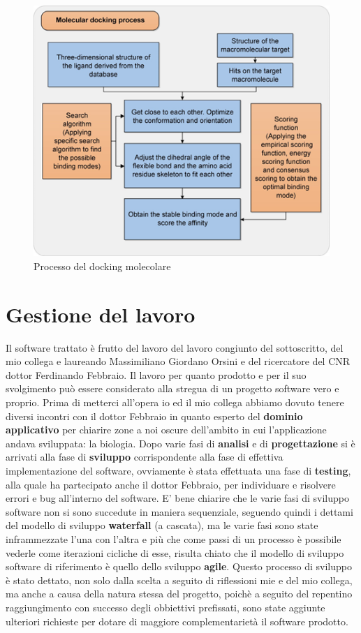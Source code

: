 \begin{figure}[H]
    \centering
    \includegraphics{immagini/processoDockingMolecolare.png}
    \caption{Processo del docking molecolare}
    \label{fig:Processo del docking Molecolare}
\end{figure}

\section{Gestione del lavoro}
Il software trattato è frutto del lavoro del lavoro congiunto del sottoscritto, del mio collega e laureando Massimiliano Giordano Orsini e del ricercatore del CNR dottor Ferdinando Febbraio. Il lavoro per quanto prodotto e per il suo svolgimento può essere considerato alla stregua di un progetto software vero e proprio. Prima di metterci all'opera io ed il mio collega abbiamo dovuto tenere diversi incontri con il dottor Febbraio in quanto esperto del \textbf{dominio applicativo} per chiarire zone a noi oscure dell'ambito in cui l'applicazione andava sviluppata: la biologia. Dopo varie fasi di \textbf{analisi} e di \textbf{progettazione} si è arrivati alla fase di \textbf{sviluppo} corrispondente alla fase di effettiva implementazione del software, ovviamente è stata effettuata una fase di \textbf{testing}, alla quale ha partecipato anche il dottor Febbraio, per individuare e risolvere errori e bug all'interno del software. E' bene chiarire che le varie fasi di sviluppo software non si sono succedute in maniera sequenziale, seguendo quindi i dettami del modello di sviluppo \textbf{waterfall} (a cascata), ma le varie fasi sono state inframmezzate l'una con l'altra e più che come passi di un processo è possibile vederle come iterazioni cicliche di esse, risulta chiato che il modello di sviluppo software di riferimento è quello dello sviluppo \textbf{agile}.\newline
Questo processo di sviluppo è stato dettato, non solo dalla scelta a seguito di riflessioni mie e del mio collega, ma anche a causa della natura stessa del progetto, poichè a seguito del repentino raggiungimento con successo degli obbiettivi prefissati, sono state aggiunte ulteriori richieste per dotare di maggiore complementarietà il software prodotto.

